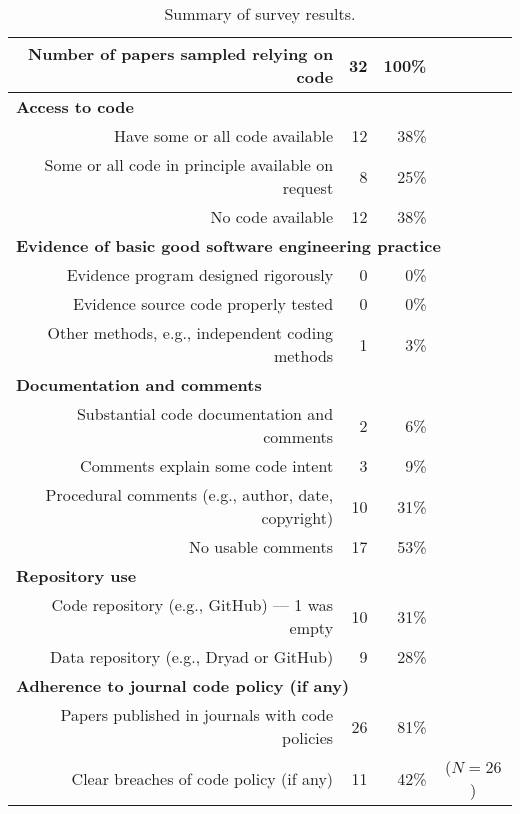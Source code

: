\documentclass[10pt,letterpaper]{article}
\begin{document}
\begin{table*}
\begin{center}\normalsize
\begin{tabular}{|rrrc|}\hline
Number of papers sampled relying on code&32&100\%&\\\hline\hline
\multicolumn{4}{|l|}{\textbf{Access to code}}\\
Have some or all code available&12&38\%&\\
Some or all code in principle available on request&8&25\%&\\
No code available&12&38\%&\\\hline
\multicolumn{4}{|l|}{{\textbf{Evidence of basic good software engineering practice}}}\\
{Evidence program designed rigorously}&{0}&{0\%}&\\
{Evidence source code properly tested}&{0}&{0\%}&\\
{Other methods, e.g., independent coding methods}&{1}&{3\%}&\\\hline
\multicolumn{4}{|l|}{\textbf{Documentation and comments}}\\
Substantial code documentation and comments&2&6\%&\\
Comments explain some code intent&3&9\%&\\
Procedural comments (e.g., author, date, copyright)&10&31\%&\\
No usable comments&17&53\%&\\\hline
\multicolumn{4}{|l|}{\textbf{Repository use}}\\
Code repository (e.g., GitHub) --- 1 was empty&10&31\%&\\
Data repository (e.g., Dryad or GitHub)&9&28\%&\\\hline
\multicolumn{4}{|l|}{\textbf{Adherence to journal code policy (if any)}}\\
Papers published in journals with code policies&26&81\%&\\
Clear breaches of code policy (if any) & 11&42\%&($N=26$)\\
\hline\end{tabular}
\end{center}

\caption{Summary of survey results.}
\label{table-summary}
\end{table*}
\end{document}
